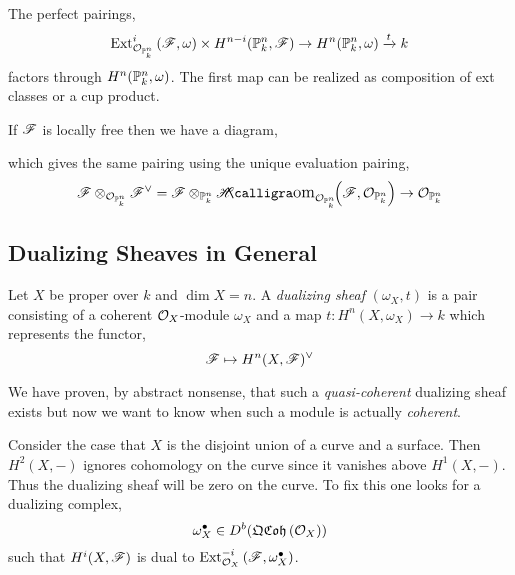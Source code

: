 \documentclass[12pt]{article}
\begin{document}
\begin{rmk}
The perfect pairings,
\[ \Ext{i}{\struct{\P^n_k}}{\F}{\omega} \times H^{n-i}(\P^n_k, \F) \to H^n(\P^n_k, \omega) \xrightarrow{t} k \]
factors through $H^n(\P^n_k, \omega)$. The first map can be realized as composition of ext classes or a cup product. 
\end{rmk}

\begin{rmk}
If $\F$ is locally free then we have a diagram,
\begin{center}
\end{center}
which gives the same pairing using the unique evaluation pairing, 
\[ \F \otimes_{\struct{\P^n_k}} \F^\vee = \F \otimes_{\P^n_k} \shHom{\struct{\P^n_k}}{\F}{\struct{\P^n_k}} \to \struct{\P^n_k} \]
\end{rmk}

\subsection{Dualizing Sheaves in General}

\begin{defn}
Let $X$ be proper over $k$ and $\dim{X} = n$. A \textit{dualizing sheaf} $(\omega_X, t)$ is a pair consisting of a coherent $\struct{X}$-module $\omega_X$ and a map $t : H^n(X, \omega_X) \to k$ which represents the functor,
\[ \F \mapsto H^n(X, \F)^\vee \]
\end{defn}

\begin{rmk}
We have proven, by abstract nonsense, that such a \textit{quasi-coherent} dualizing sheaf exists but now we want to know when such a module is actually \textit{coherent}. 
\end{rmk}

\begin{rmk}
Consider the case that $X$ is the disjoint union of a curve and a surface. Then $H^2(X, -)$ ignores cohomology on the curve since it vanishes above $H^1(X, -)$. Thus the dualizing sheaf will be zero on the curve. To fix this one looks for a dualizing complex,
\[ \omega_X^\bullet \in D^b(\QCoh{\struct{X}}) \]
such that $H^i(X, \F)$ is dual to $\Ext{-i}{\struct{X}}{\F}{\omega_X^\bullet}$. 
\end{rmk}
\end{document}
